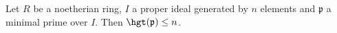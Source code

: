 Let $R$ be a noetherian ring, $I$ a proper ideal generated by $n$ elements and
$\mathfrak{p}$ a minimal prime over $I$. Then $\hgt(\mathfrak{p})\leq n$.
